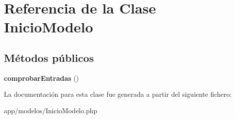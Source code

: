 \hypertarget{classInicioModelo}{}\section{Referencia de la Clase Inicio\+Modelo}
\label{classInicioModelo}
\subsection*{Métodos públicos}
\begin{DoxyCompactItemize}
\item 
\mbox{\label{classInicioModelo_a70d695474f915e8393b7ee155988c59d}} 
{\bfseries comprobar\+Entradas} ()
\end{DoxyCompactItemize}


La documentación para esta clase fue generada a partir del siguiente fichero\+:\begin{DoxyCompactItemize}
\item 
app/modelos/Inicio\+Modelo.\+php\end{DoxyCompactItemize}
